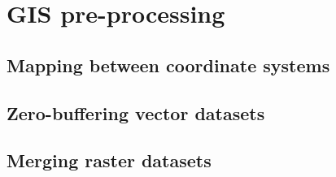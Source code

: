 \appendix
\chapter{GIS pre-processing}

\section{Mapping between coordinate systems}%
\label{app:srid-change}


\section{Zero-buffering vector datasets}%
\label{app:zero-buffer}


\section{Merging raster datasets}%
\label{app:raster-merging}

